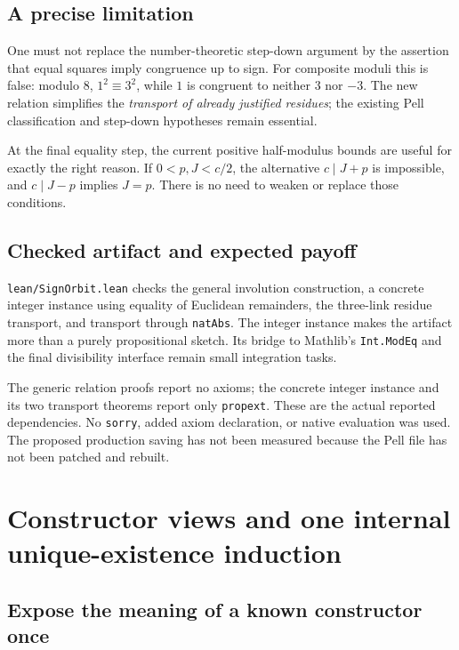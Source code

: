 \documentclass[11pt]{article}
\theoremstyle{remark}\newtheorem{remark}[theorem]{Remark}
\newcommand{\code}[1]{\nolinkurl{#1}}
\begin{document}
\subsection{A precise limitation}

One must not replace the number-theoretic step-down argument by the assertion that equal squares imply congruence up to sign. For composite moduli this is false: modulo \(8\), \(1^2\equiv3^2\), while \(1\) is congruent to neither \(3\) nor \(-3\). The new relation simplifies the \emph{transport of already justified residues}; the existing Pell classification and step-down hypotheses remain essential.

At the final equality step, the current positive half-modulus bounds are useful for exactly the right reason. If \(0<p,J<c/2\), the alternative \(c\mid J+p\) is impossible, and \(c\mid J-p\) implies \(J=p\). There is no need to weaken or replace those conditions.

\subsection{Checked artifact and expected payoff}

\code{lean/SignOrbit.lean} checks the general involution construction, a concrete integer instance using equality of Euclidean remainders, the three-link residue transport, and transport through \code{natAbs}. The integer instance makes the artifact more than a purely propositional sketch. Its bridge to Mathlib's \code{Int.ModEq} and the final divisibility interface remain small integration tasks.

The generic relation proofs report no axioms; the concrete integer instance and its two transport theorems report only \code{propext}. These are the actual reported dependencies. No \code{sorry}, added axiom declaration, or native evaluation was used. The proposed production saving has not been measured because the Pell file has not been patched and rebuilt.

\section{Constructor views and one internal unique-existence induction}
\label{sec:constructors}

\subsection{Expose the meaning of a known constructor once}
\end{document}
